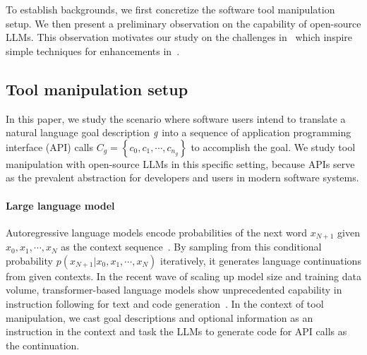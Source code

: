 % 
To establish backgrounds, we first concretize the software tool manipulation setup. We then present a preliminary observation on the capability of open-source LLMs. This observation motivates our study on the challenges in~ which inspire simple techniques for enhancements in~.  

\subsection{Tool manipulation setup}
\label{subsec:tool_setup}
In this paper, we study the scenario where software users intend to translate a natural language goal description $\emph{g}$ into a sequence of application programming interface (API) calls $C_g = \left\{c_0, c_1, \cdots, c_{n_g} \right\}$ to accomplish the goal. We study tool manipulation with open-source LLMs in this specific setting, because APIs serve as the prevalent abstraction for developers and users in modern software systems. 

\paragraph{Large language model} Autoregressive language models encode probabilities of the next word $x_{N + 1}$ given $x_0, x_1, \cdots, x_N$ as the context sequence~\cite{dan_ngram}. By sampling from this conditional probability $p\left(x_{N + 1} | x_0, x_1, \cdots, x_N\right)$ iteratively, it generates language continuations from given contexts. In the recent wave of scaling up model size and training data volume, transformer-based language models show unprecedented capability in instruction following for text and code generation~\cite{brown2020language,sanh2021multitask,chen2021evaluating}. In the context of tool manipulation, we cast goal descriptions and optional information as an instruction in the context and task the LLMs to generate code for API calls as the continuation. 

